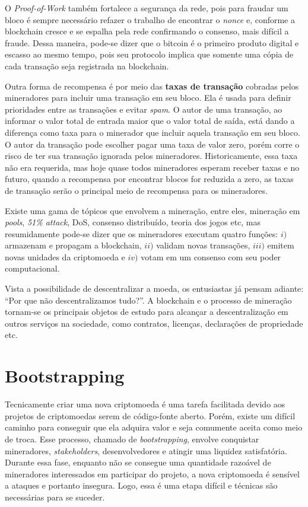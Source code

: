 O \textit{Proof-of-Work} também fortalece a segurança da rede, pois para fraudar um bloco é sempre necessário refazer o trabalho de encontrar o \textit{nonce} e, conforme a blockchain cresce e se espalha pela rede confirmando o consenso, mais difícil a fraude. Dessa maneira, pode-se dizer que o bitcoin é o primeiro produto digital e escasso ao mesmo tempo, pois seu protocolo implica que somente uma cópia de cada transação seja registrada na blockchain.

Outra forma de recompensa é por meio das \textbf{taxas de transação} cobradas pelos mineradores para incluir uma transação em seu bloco. Ela é usada para definir prioridades entre as transações e evitar \textit{spam}. O autor de uma transação, ao informar o valor total de entrada maior que o valor total de saída, está dando a diferença como taxa para o minerador que incluir aquela transação em seu bloco. O autor da transação pode escolher pagar uma taxa de valor zero, porém corre o risco de ter sua transação ignorada pelos mineradores. Historicamente, essa taxa não era requerida, mas hoje quase todos mineradores esperam receber taxas e no futuro, quando a recompensa por encontrar blocos for reduzida a zero, as taxas de transação serão o principal meio de recompensa para os mineradores.

Existe uma gama de tópicos que envolvem a mineração, entre eles, mineração em \textit{pools}, \textit{51\% attack}, DoS, consenso distribuído, teoria dos jogos etc, mas resumidamente pode-se dizer que os mineradores executam quatro funções: $i)$ armazenam e propagam a blockchain, $ii)$ validam novas transações, $iii)$ emitem novas unidades da criptomoeda e $iv)$ votam em um consenso com seu poder computacional.

Vista a possibilidade de descentralizar a moeda, os entusiastas já pensam adiante: ``Por que não descentralizamos tudo?''. A blockchain e o processo de mineração tornam-se os principais objetos de estudo para alcançar a descentralização em outros serviços na sociedade, como contratos, licenças, declarações de propriedade etc.

\section{Bootstrapping}

Tecnicamente criar uma nova criptomoeda é uma tarefa facilitada devido aos projetos de criptomoedas serem de código-fonte aberto. Porém, existe um difícil caminho para conseguir que ela adquira valor e seja comumente aceita como meio de troca. Esse processo, chamado de \textit{bootstrapping}, envolve conquistar mineradores, \textit{stakeholders}, desenvolvedores e atingir uma liquidez satisfatória. Durante essa fase, enquanto não se consegue uma quantidade razoável de mineradores interessados em participar do projeto, a nova criptomoeda é sensível a ataques e portanto insegura. Logo, essa é uma etapa difícil e técnicas são necessárias para se suceder.

